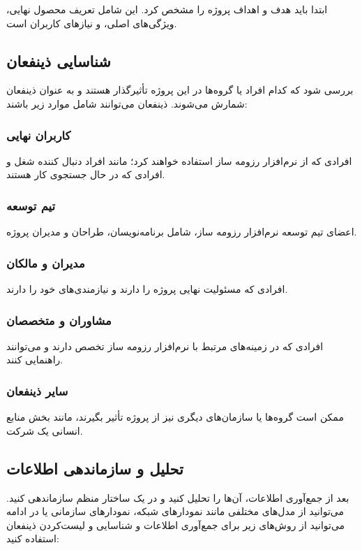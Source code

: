 \documentclass[]{article}
\begin{document}
	ابتدا باید هدف و اهداف پروژه را مشخص کرد. این شامل تعریف محصول نهایی، ویژگی‌های اصلی، و نیازهای کاربران است.
	
	
	\subsection{\LARGE{شناسایی ذینفعان}}
	بررسی شود که کدام افراد یا گروه‌ها در این پروژه تأثیرگذار هستند و به عنوان ذینفعان شمارش می‌شوند. ذینفعان می‌توانند شامل موارد زیر باشند:
	
	\subsubsection{\Large{کاربران نهایی}}
	
	افرادی که از نرم‌افزار رزومه ساز استفاده خواهند کرد؛ مانند افراد دنبال کننده شغل و افرادی که در حال جستجوی کار هستند.
	
	
	\subsubsection{\Large{تیم توسعه}}
	اعضای تیم توسعه نرم‌افزار رزومه ساز، شامل برنامه‌نویسان، طراحان و مدیران پروژه.
	
	\subsubsection{\Large{مدیران و مالکان}}
	افرادی که مسئولیت نهایی پروژه را دارند و نیازمندی‌های خود را دارند.
	
	\subsubsection{\Large{مشاوران و متخصصان}}
	افرادی که در زمینه‌های مرتبط با نرم‌افزار رزومه ساز تخصص دارند و می‌توانند راهنمایی کنند.
	
	\subsubsection{\Large{سایر ذینفعان}}
	ممکن است گروه‌ها یا سازمان‌های دیگری نیز از پروژه تأثیر بگیرند، مانند بخش منابع انسانی یک شرکت.
	
	
	\subsection{\LARGE{تحلیل و سازماندهی اطلاعات}}
	بعد از جمع‌آوری اطلاعات، آن‌ها را تحلیل کنید و در یک ساختار منظم سازماندهی کنید. می‌توانید از مدل‌های مختلفی مانند نمودارهای شبکه، نمودارهای سازمانی یا در ادامه می‌توانید از روش‌های زیر برای جمع‌آوری اطلاعات و شناسایی و لیست‌کردن ذینفعان استفاده کنید:
	
\end{document}
